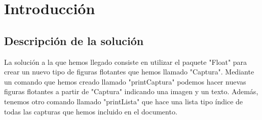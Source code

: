 
\chapter {Introducción}
\label{sec:intro}
\pagebreak

\section{Descripción de la solución}

La solución a la que hemos llegado consiste en utilizar el paquete "Float" para crear un nuevo tipo de figuras flotantes que hemos llamado "Captura". Mediante un comando que hemos creado llamado "printCaptura" podemos hacer nuevas figuras flotantes a partir de "Captura" indicando una imagen y un texto. Además, tenemos otro comando llamado "printLista" que hace una lista tipo índice de todas las capturas que hemos incluido en el documento.
